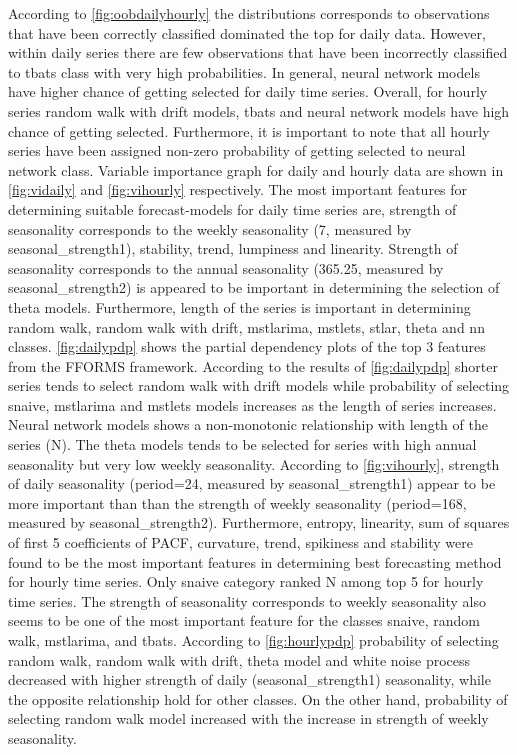 \documentclass[11pt,a4paper,]{article}
\begin{document}
According to \autoref{fig:oobdailyhourly} the distributions corresponds
to observations that have been correctly classified dominated the top
for daily data. However, within daily series there are few observations
that have been incorrectly classified to tbats class with very high
probabilities. In general, neural network models have higher chance of
getting selected for daily time series. Overall, for hourly series
random walk with drift models, tbats and neural network models have high
chance of getting selected. Furthermore, it is important to note that
all hourly series have been assigned non-zero probability of getting
selected to neural network class. Variable importance graph for daily
and hourly data are shown in \autoref{fig:vidaily} and
\autoref{fig:vihourly} respectively. The most important features for
determining suitable forecast-models for daily time series are, strength
of seasonality corresponds to the weekly seasonality (7, measured by
seasonal\_strength1), stability, trend, lumpiness and linearity.
Strength of seasonality corresponds to the annual seasonality (365.25,
measured by seasonal\_strength2) is appeared to be important in
determining the selection of theta models. Furthermore, length of the
series is important in determining random walk, random walk with drift,
mstlarima, mstlets, stlar, theta and nn classes. \autoref{fig:dailypdp}
shows the partial dependency plots of the top 3 features from the FFORMS
framework. According to the results of \autoref{fig:dailypdp} shorter
series tends to select random walk with drift models while probability
of selecting snaive, mstlarima and mstlets models increases as the
length of series increases. Neural network models shows a non-monotonic
relationship with length of the series (N). The theta models tends to be
selected for series with high annual seasonality but very low weekly
seasonality. According to \autoref{fig:vihourly}, strength of daily
seasonality (period=24, measured by seasonal\_strength1) appear to be
more important than than the strength of weekly seasonality (period=168,
measured by seasonal\_strength2). Furthermore, entropy, linearity, sum
of squares of first 5 coefficients of PACF, curvature, trend, spikiness
and stability were found to be the most important features in
determining best forecasting method for hourly time series. Only snaive
category ranked N among top 5 for hourly time series. The strength of
seasonality corresponds to weekly seasonality also seems to be one of
the most important feature for the classes snaive, random walk,
mstlarima, and tbats. According to \autoref{fig:hourlypdp} probability
of selecting random walk, random walk with drift, theta model and white
noise process decreased with higher strength of daily
(seasonal\_strength1) seasonality, while the opposite relationship hold
for other classes. On the other hand, probability of selecting random
walk model increased with the increase in strength of weekly
seasonality.
\end{document}
